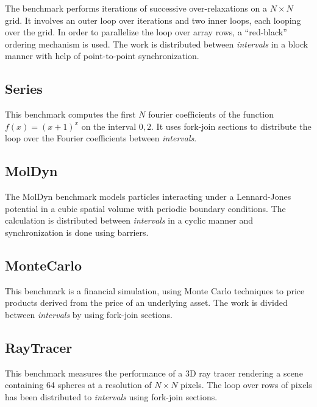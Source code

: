 The benchmark performs iterations of successive over-relaxations on a
$N \times N$ grid. It involves an outer loop over iterations and two
inner loops, each looping over the grid. In order to parallelize the
loop over array rows, a ``red-black'' ordering mechanism is used. The
work is distributed between \emph{intervals} in a block manner with
help of point-to-point synchronization.

\subsection*{Series}

This benchmark computes the first $N$ fourier coefficients of the
function $f(x) = (x+1)^x$ on the interval $0,2$. It uses fork-join
sections to distribute the loop over the Fourier coefficients between
\emph{intervals}.

\subsection*{MolDyn}

The MolDyn benchmark models particles interacting under a
Lennard-Jones potential in a cubic spatial volume with periodic
boundary conditions. The calculation is distributed between
\emph{intervals} in a cyclic manner and synchronization is done using
barriers.

\subsection*{MonteCarlo}

This benchmark is a financial simulation, using Monte Carlo techniques
to price products derived from the price of an underlying asset. The
work is divided between \emph{intervals} by using fork-join sections.

\subsection*{RayTracer}

This benchmark measures the performance of a 3D ray tracer rendering a
scene containing 64 spheres at a resolution of $N \times N$
pixels. The loop over rows of pixels has been distributed to
\emph{intervals} using fork-join sections.


